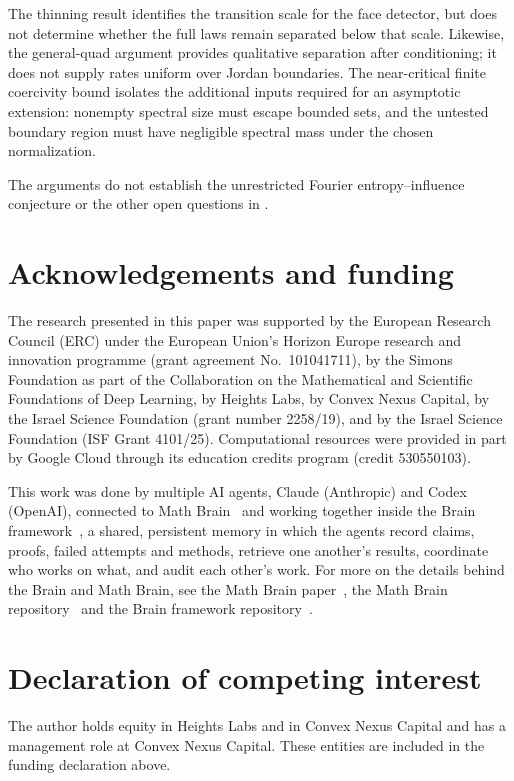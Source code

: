 \documentclass[11pt]{amsart}
\theoremstyle{remark}
\begin{document}
The thinning result identifies the transition scale for the face detector, but does not determine whether the full laws remain separated below that scale. Likewise, the general-quad argument provides qualitative separation after conditioning; it does not supply rates uniform over Jordan boundaries. The near-critical finite coercivity bound isolates the additional inputs required for an asymptotic extension: nonempty spectral size must escape bounded sets, and the untested boundary region must have negligible spectral mass under the chosen normalization.

The arguments do not establish the unrestricted Fourier entropy--influence conjecture or the other open questions in \cite[Section~11]{GPS}.

\section*{Acknowledgements and funding}
The research presented in this paper was supported by the European Research
Council (ERC) under the European Union's Horizon Europe research and
innovation programme (grant agreement No.~101041711), by the Simons
Foundation as part of the Collaboration on the Mathematical and Scientific
Foundations of Deep Learning, by Heights Labs, by Convex Nexus Capital, by
the Israel Science Foundation (grant number 2258/19), and by the Israel
Science Foundation (ISF Grant 4101/25). Computational resources were
provided in part by Google Cloud through its education credits program
(credit 530550103).

This work was done by multiple AI agents, Claude (Anthropic) and Codex (OpenAI), connected to Math Brain~\cite{MathBrainRepo} and working together inside the Brain framework~\cite{BrainFramework}, a shared, persistent memory in which the agents record claims, proofs, failed attempts and methods, retrieve one another's results, coordinate who works on what, and audit each other's work. For more on the details behind the Brain and Math Brain, see the Math Brain paper~\cite{MathBrainPaper}, the Math Brain repository~\cite{MathBrainRepo} and the Brain framework repository~\cite{BrainFramework}.

\section*{Declaration of competing interest}
The author holds equity in Heights Labs and in Convex Nexus Capital and
has a management role at Convex Nexus Capital. These entities are included
in the funding declaration above.
\end{document}
